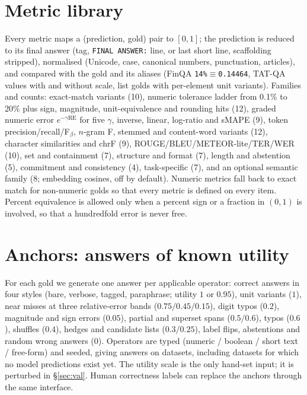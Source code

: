 \documentclass[10pt,twocolumn]{article}
\begin{document}
\section{Metric library}\label{sec:lib}
Every metric maps a (prediction, gold) pair to $[0,1]$; the prediction is reduced to its final answer (tag, \texttt{FINAL ANSWER:} line, or last short line, scaffolding stripped), normalised (Unicode, case, canonical numbers, punctuation, articles), and compared with the gold and its aliases (FinQA \texttt{14\%}$\equiv$\texttt{0.14464}, TAT-QA values with and without scale, list golds with per-element unit variants). Families and counts: exact-match variants (10), numeric tolerance ladder from 0.1\% to 20\% plus sign, magnitude, unit-equivalence and rounding hits (12), graded numeric error $e^{-\gamma\mathrm{RE}}$ for five $\gamma$, inverse, linear, log-ratio and sMAPE (9), token precision/recall/F$_\beta$, $n$-gram F, stemmed and content-word variants (12), character similarities and chrF (9), ROUGE/BLEU/METEOR-lite/TER/WER (10), set and containment (7), structure and format (7), length and abstention (5), commitment and consistency (4), task-specific (7), and an optional semantic family (8; embedding cosines, off by default). Numeric metrics fall back to exact match for non-numeric golds so that every metric is defined on every item. Percent equivalence is allowed only when a percent sign or a fraction in $(0,1)$ is involved, so that a hundredfold error is never free.

\section{Anchors: answers of known utility}\label{sec:anchors}
For each gold we generate one answer per applicable operator: correct answers in four styles (bare, verbose, tagged, paraphrase; utility $1$ or $0.95$), unit variants ($1$), near misses at three relative-error bands ($0.75/0.45/0.15$), digit typos ($0.2$), magnitude and sign errors ($0.05$), partial and superset spans ($0.5/0.6$), typos ($0.6$), shuffles ($0.4$), hedges and candidate lists ($0.3/0.25$), label flips, abstentions and random wrong answers ($0$). Operators are typed (numeric / boolean / short text / free-form) and seeded, giving \nAnchors{} answers on \nAnchorDatasets{} datasets, including datasets for which no model predictions exist yet. The utility scale is the only hand-set input; it is perturbed in \S\ref{sec:val}. Human correctness labels can replace the anchors through the same interface.
\end{document}
